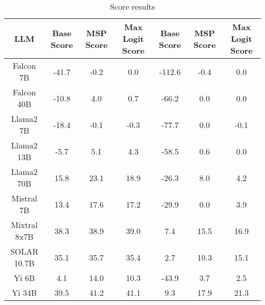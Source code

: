 \renewcommand\arraystretch{1.2}
\begin{table*}
\centering
\begin{tabular}{c|c|c|c|c|c|c}
LLM & Base Score & MSP Score & Max Logit Score & Base Score & MSP Score & Max Logit Score\\ \hline
Falcon 7B & -41.7 & -0.2 & 0.0 & -112.6 & -0.4 & 0.0\\
Falcon 40B & -10.8 & 4.0 & 0.7 & -66.2 & 0.0 & 0.0\\
Llama2 7B & -18.4 & -0.1 & -0.3 & -77.7 & 0.0 & -0.1\\
Llama2 13B & -5.7 & 5.1 & 4.3 & -58.5 & 0.6 & 0.0\\
Llama2 70B & 15.8 & 23.1 & 18.9 & -26.3 & 8.0 & 4.2\\
Mistral 7B & 13.4 & 17.6 & 17.2 & -29.9 & 0.0 & 3.9\\
Mixtral 8x7B & 38.3 & 38.9 & 39.0 & 7.4 & 15.5 & 16.9\\
SOLAR 10.7B & 35.1 & 35.7 & 35.4 & 2.7 & 10.3 & 15.1\\
Yi 6B & 4.1 & 14.0 & 10.3 & -43.9 & 3.7 & 2.5\\
Yi 34B & 39.5 & 41.2 & 41.1 & 9.3 & 17.9 & 21.3\\
\hline
\end{tabular}
\caption{Score results}
\end{table*}
\label{tab:score}
